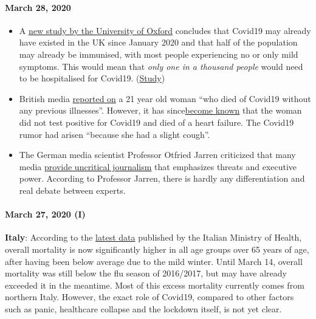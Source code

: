 \hypertarget{march-28-2020}{%
\paragraph{March 28, 2020}\label{march-28-2020}}

\begin{itemize}
\tightlist
\item
  A
  \href{https://news.yahoo.com/oxford-study-suggests-millions-people-221100162.html}{new
  study by the University of Oxford} concludes that Covid19 may already
  have existed in the UK since January 2020 and that half of the
  population may already be immunised, with most people experiencing no
  or only mild symptoms. This would mean that \emph{only one in a
  thousand people} would need to be hospitalised for Covid19.
  (\href{https://www.medrxiv.org/content/10.1101/2020.03.24.20042291v1}{Study})
\item
  British media
  \href{https://www.bbc.com/news/uk-england-beds-bucks-herts-52041709}{reported
  on} a 21 year old woman ``who died of Covid19 without any previous
  illnesses''. However, it has
  since\href{https://archive.is/20200329015127/https://www.theguardian.com/world/2020/mar/27/chloe-middleton-death-21-year-old-not-recorded-nhs-covid-19-related}{become
  known} that the woman did not test positive for Covid19 and died of a
  heart failure. The Covid19 rumor had arisen ``because she had a slight
  cough''.
\item
  The German media scientist Professor Otfried Jarren criticized that
  many media
  \href{https://www.deutschlandfunk.de/covid-19-scharfe-kritik-an-ard-und-zdf-wegen.2849.de.html?drn:news_id=1117133}{provide
  uncritical journalism} that emphasizes threats and executive power.
  According to Professor Jarren, there is hardly any differentiation and
  real debate between experts.
\end{itemize}

\hypertarget{march-27-2020-i}{%
\paragraph{March 27, 2020 (I)}\label{march-27-2020-i}}

\textbf{Italy}: According to the
\href{http://www.salute.gov.it/portale/caldo/SISMG_sintesi_ULTIMO.pdf}{latest
data} published by the Italian Ministry of Health, overall mortality is
now significantly higher in all age groups over 65 years of age, after
having been below average due to the mild winter. Until March 14,
overall mortality was still below the flu season of 2016/2017, but may
have already exceeded it in the meantime. Most of this excess mortality
currently comes from northern Italy. However, the exact role of Covid19,
compared to other factors such as panic, healthcare collapse and the
lockdown itself, is not yet clear.

